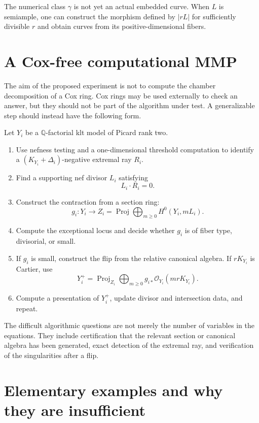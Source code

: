 \documentclass[11pt]{article}
\newcommand{\Proj}{\operatorname{Proj}}
\newcommand{\cO}{\mathcal O}
\begin{document}
The numerical class $\gamma$ is not yet an actual embedded curve.  When $L$ is
semiample, one can construct the morphism defined by $|rL|$ for sufficiently
divisible $r$ and obtain curves from its positive-dimensional fibers.

\section{A Cox-free computational MMP}

The aim of the proposed experiment is not to compute the chamber decomposition
of a Cox ring.  Cox rings may be used externally to check an answer, but they
should not be part of the algorithm under test.  A generalizable step should
instead have the following form.

Let $Y_i$ be a $\mathbb Q$-factorial klt model of Picard rank two.
\begin{enumerate}
  \item Use nefness testing and a one-dimensional threshold computation to
        identify a $(K_{Y_i}+\Delta_i)$-negative extremal ray $R_i$.
  \item Find a supporting nef divisor $L_i$ satisfying
        \[
          L_i\cdot R_i=0.
        \]
  \item Construct the contraction from a section ring:
        \[
          g_i\colon Y_i\longrightarrow Z_i
          =\Proj\bigoplus_{m\geq 0}H^0(Y_i,mL_i).
        \]
  \item Compute the exceptional locus and decide whether $g_i$ is of fiber
        type, divisorial, or small.
  \item If $g_i$ is small, construct the flip from the relative canonical
        algebra.  If $rK_{Y_i}$ is Cartier, use
        \[
          Y_i^+
          =\Proj_{Z_i}
            \bigoplus_{m\geq 0}
            g_{i*}\cO_{Y_i}(mrK_{Y_i}).
        \]
  \item Compute a presentation of $Y_i^+$, update divisor and intersection
        data, and repeat.
\end{enumerate}

The difficult algorithmic questions are not merely the number of variables in
the equations.  They include certification that the relevant section or
canonical algebra has been generated, exact detection of the extremal ray, and
verification of the singularities after a flip.

\section{Elementary examples and why they are insufficient}
\end{document}
